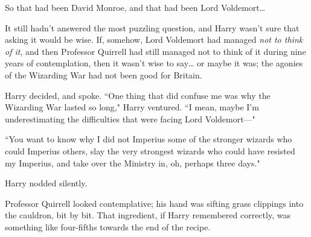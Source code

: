So that had been David Monroe, and that had been Lord Voldemort{\ldots}

It still hadn't answered the most puzzling question, and Harry wasn't sure that asking it would be wise. If, somehow, Lord Voldemort had managed \emph{not to think of it}, and then Professor Quirrell had still managed not to think of it during nine years of contemplation, then it wasn't wise to say{\ldots} or maybe it was; the agonies of the Wizarding War had not been good for Britain.

Harry decided, and spoke. ``One thing that did confuse me was why the Wizarding War lasted so long," Harry ventured. ``I mean, maybe I'm underestimating the difficulties that were facing Lord Voldemort—"

``You want to know why I did not Imperius some of the stronger wizards who could Imperius others, slay the very strongest wizards who could have resisted my Imperius, and take over the Ministry in, oh, perhaps three days."

Harry nodded silently.

Professor Quirrell looked contemplative; his hand was sifting grass clippings into the cauldron, bit by bit. That ingredient, if Harry remembered correctly, was something like four-fifths towards the end of the recipe.

